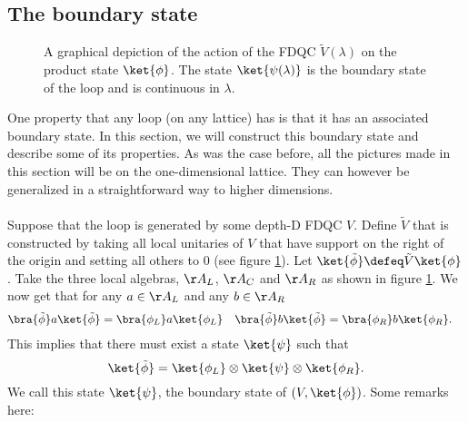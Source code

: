 \subsection{The boundary state}\label{sec:the-boundary-state}
\begin{figure}
	\centering
	\scalebox{0.6}{
		
	}
	\caption{A graphical depiction of the action of the FDQC $\tilde{V}(\lambda)$ on the product state $\ket{\phi}$. The state $\ket{\psi(\lambda)}$ is the boundary state of the loop and is continuous in $\lambda$.}
	\label{fig:G_InvariantContraction_WithLightcone}
\end{figure}
One property that any loop (on any lattice) has is that it has an associated boundary state. In this section, we will construct this boundary state and describe some of its properties. As was the case before, all the pictures made in this section will be on the one-dimensional lattice. They can however be generalized in a straightforward way to higher dimensions.\\\\
Suppose that the loop is generated by some depth-D FDQC $V$. Define $\tilde{V}$ that is constructed by taking all local unitaries of $V$ that have support on the right of the origin and setting all others to $0$ (see figure \ref{fig:G_InvariantContraction_WithLightcone}). Let $\ket{\tilde{\phi}}\defeq \tilde{V}\ket{\phi}$. Take the three local algebras, $\AA_L$, $\AA_C$ and $\AA_R$ as shown in figure \ref{fig:G_InvariantContraction_WithLightcone}. We now get that for any $a\in \AA_L$ and any $b\in\AA_R$
\begin{align}
\bra{\tilde{\phi}}a\ket{\tilde{\phi}}&=\bra{\phi_L}a\ket{\phi_L}&\bra{\tilde{\phi}}b\ket{\tilde{\phi}}&=\bra{\phi_R}b\ket{\phi_R}.
\end{align}
This implies that there must exist a state $\ket{\psi}$ such that
\begin{equation}
\ket{\tilde{\phi}}=\ket{\phi_L}\otimes\ket{\psi}\otimes\ket{\phi_R}.
\end{equation}
We call this state $\ket{\psi}$, the boundary state of $(V,\ket{\phi})$. Some remarks here:

